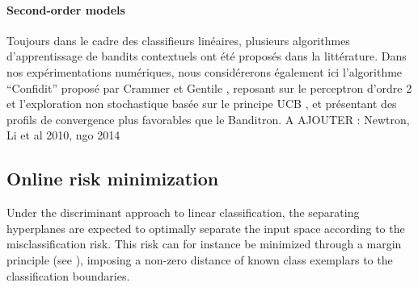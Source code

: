 \documentclass[preprint,12pt,authoryear]{elsarticle}
\begin{document}
\paragraph{Second-order models} 
{\color{blue}
Toujours dans le cadre des classifieurs linéaires, plusieurs algorithmes d'apprentissage de bandits contextuels ont été proposés dans la littérature. Dans nos expérimentations numériques, nous considérerons également ici l'algorithme ``Confidit'' proposé par Crammer et Gentile \cite{crammer2013multiclass}, reposant sur le perceptron d'ordre 2 et l'exploration non stochastique basée sur le principe UCB \cite{lai1985asymptotically}, et présentant des profils de convergence plus favorables que le Banditron. A AJOUTER : Newtron, Li et al 2010, ngo 2014}



\subsection{Online risk minimization}
Under the discriminant approach to linear classification, the separating hyperplanes are expected to optimally separate the input space according to the misclassification risk. This risk can for instance be minimized through a margin principle (see \cite{vapnik1998statistical}), imposing a non-zero distance of known class exemplars to the classification boundaries. 
\end{document}
